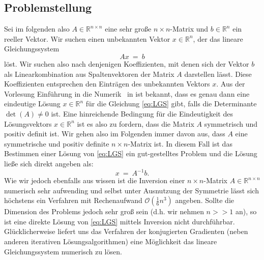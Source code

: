 \subsection{Problemstellung}
\label{ss:cg_problemstellung}
Sei im folgenden also $A \in \mathbb{R}^{n \times n}$ eine sehr große $n \times n$-Matrix und $b \in \mathbb{R}^n$ ein reeller Vektor.
Wir suchen einen unbekannten Vektor $x \in \mathbb{R}^n$, der das lineare Gleichungssystem
\begin{equation}
\label{eq:LGS}
Ax \ = \ b
\end{equation}
löst.
Wir suchen also nach denjenigen Koeffizienten, mit denen sich der Vektor $b$ als Linearkombination aus Spaltenvektoren der Matrix $A$ darstellen lässt. 
Diese Koeffizienten entsprechen den Einträgen des unbekannten Vektors $x$.
Aus der Vorlesung \glqq Einführung in die Numerik\grqq~ in \cite[Kapitel 2]{numerik1} ist bekannt, dass es genau dann eine eindeutige Lösung $x \in \mathbb{R}^n$ für die Gleichung \eqref{eq:LGS} gibt, falls die Determinante $\operatorname{det}(A) \neq 0$ ist.
Eine hinreichende Bedingung für die Eindeutigkeit des Lösungsvektors $x \in \mathbb{R}^n$ ist es also zu fordern, dass die Matrix $A$ symmetrisch und positiv definit ist.
Wir gehen also im Folgenden immer davon aus, dass $A$ eine symmetrische und positiv definite $n \times n$-Matrix ist.
In diesem Fall ist das Bestimmen einer Lösung von \eqref{eq:LGS} ein gut-gestelltes Problem und die Lösung ließe sich direkt angeben als:
\begin{equation*}
x \ = \ A^{-1}b.
\end{equation*}
Wie wir jedoch ebenfalls aus \cite[Kapitel 2]{numerik1} wissen ist die Inversion einer $n\times n$-Matrix $A \in \mathbb{R}^{n\times n}$ numerisch sehr aufwending und selbst unter Ausnutzung der Symmetrie lässt sich höchstens ein Verfahren mit Rechenaufwand $\mathcal{O}(\frac{1}{6}n^3)$ angeben.
Sollte die Dimension des Problems jedoch sehr groß sein (d.h. wir nehmen $n >> 1$ an), so ist eine direkte Lösung von \eqref{eq:LGS} mittels Inversion nicht durchführbar.
Glücklicherweise liefert uns das Verfahren der konjugierten Gradienten (neben anderen iterativen Lösungsalgorithmen) eine Möglichkeit das lineare Gleichungssystem numerisch zu lösen.

